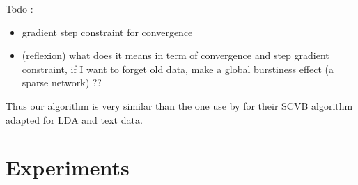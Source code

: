 Todo :
\begin{itemize}
    \item gradient step constraint for convergence
    \item (reflexion) what does  it means in term of convergence and step gradient constraint,  if I want to forget old data, make a global burstiness effect (a sparse network) ??
\end{itemize}

Thus our algorithm is very similar than the one use by \cite{foulds2013stochastic} for their SCVB algorithm adapted for LDA and text data.









\section{Experiments}

%
